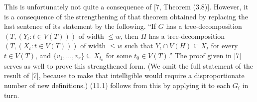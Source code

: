 This is unfortunately not quite a consequence of [7, Theorem (3.8)]. However, it is a consequence of the strengthening of that theorem obtained by replacing the last sentence of its statement by the following. ``If $G$ has a tree-decomposition $(T, (Y_t : t \in V(T)))$ of width $\le w$, then $H$ has a tree-decomposition $(T, (X_t : t \in V(T)))$ of width $\le w$ such that $Y_t \cap V(H) \subseteq X_t$ for every $t \in V(T)$, and $\{v_1, \dots, v_r\} \subseteq X_{t_0}$ for some $t_0 \in V(T)$.'' The proof given in [7] serves as well to prove this strengthened form. (We omit the full statement of the result of [7], because to make that intelligible would require a disproportionate number of new definitions.) (11.1) follows from this by applying it to each $G_i$ in turn.

